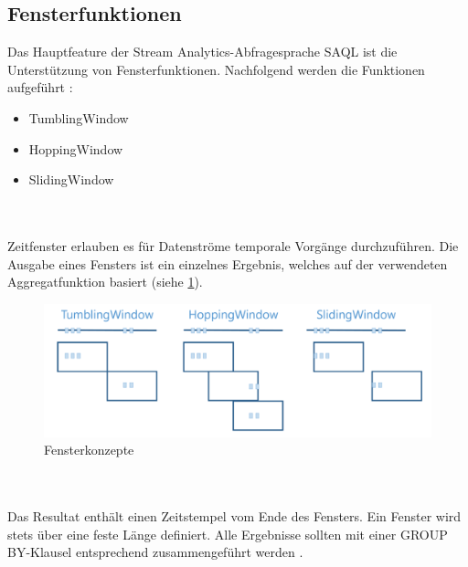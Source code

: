 \subsection{Fensterfunktionen}
Das Hauptfeature der Stream Analytics-Abfragesprache SAQL ist die Unterstützung von Fensterfunktionen. Nachfolgend werden die Funktionen aufgeführt \cite{Prosise.}: 
\begin{itemize} 
	\item TumblingWindow
	\item HoppingWindow
	\item SlidingWindow
\end{itemize}
\\ \\Zeitfenster erlauben es für Datenströme temporale Vorgänge durchzuführen. Die Ausgabe eines Fensters ist ein einzelnes Ergebnis, welches auf der verwendeten Aggregatfunktion basiert (siehe \ref{fig:window_concepts}). 
\begin{figure}[H]
	\centering
	\includegraphics[width=1.0\linewidth]{images/fensterfunktionen}
	\caption{Fensterkonzepte \cite{Prosise.}} %
	\label{fig:window_concepts}
\end{figure} 
\\ \\Das Resultat enthält einen Zeitstempel vom Ende des Fensters. Ein Fenster wird stets über eine feste Länge definiert. Alle Ergebnisse sollten mit einer GROUP BY-Klausel entsprechend zusammengeführt werden \cite{Azure.2017}. 
